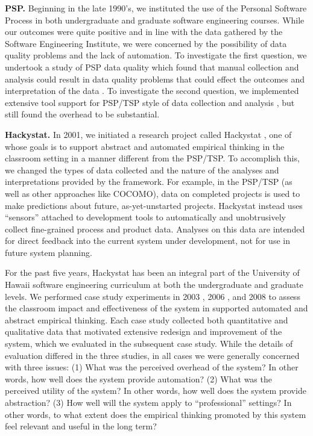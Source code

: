 {\bf PSP.} Beginning in the late 1990's, we instituted the use
of the Personal Software Process in both undergraduate and graduate
software engineering courses.  While our outcomes were quite positive and
in line with the data gathered by the Software Engineering Institute, we
were concerned by the possibility of data quality problems and the lack of
automation.  To investigate the first question, we undertook a study of PSP
data quality which found that manual collection and analysis could result
in data quality problems that could effect the outcomes and interpretation
of the data \citep{csdl-98-13,csdl-98-11}.  To investigate the second question, we
implemented extensive tool support for PSP/TSP style of data collection and
analysis \citep{csdl2-00-03}, but still found the overhead to be
substantial\citep{csdl2-01-12}. 

{\bf Hackystat.} In 2001, we initiated a research project called Hackystat
\citep{csdl2-06-06,csdl2-04-11,csdl2-02-07}, one of whose goals is to
support abstract and automated empirical thinking in the classroom setting
in a manner different from the PSP/TSP.  To accomplish this, we changed the
types of data collected and the nature of the analyses and interpretations
provided by the framework.  For example, in the PSP/TSP (as well as other
approaches like COCOMO), data on completed projects is used to make
predictions about future, as-yet-unstarted projects. Hackystat
instead uses ``sensors'' attached to development tools to automatically and
unobtrusively collect fine-grained process and product data. Analyses on
this data are intended for direct feedback into the current system under
development, not for use in future system planning.

For the past five years, Hackystat has been an integral part of the
University of Hawaii software engineering curriculum at both the
undergraduate and graduate levels.  We performed case study experiments in
2003 \citep{csdl2-03-12,csdl2-03-13}, 2006 \citep{csdl2-07-02}, and 2008
\citep{csdl2-09-02,csdl2-09-03} to assess the classroom impact and
effectiveness of the system in supported automated and abstract empirical
thinking.  Each case study collected both quantitative and qualitative data
that motivated extensive redesign and improvement of the system, which we
evaluated in the subsequent case study. While the details of evaluation
differed in the three studies, in all cases we were generally concerned
with three issues: (1) What was the perceived overhead of the system? In
other words, how well does the system provide automation?  (2) What was the
perceived utility of the system? In other words, how well does the system
provide abstraction?  (3) How well will the system apply to
``professional'' settings?  In other words, to what extent does the
empirical thinking promoted by this system feel relevant and useful in the
long term?

